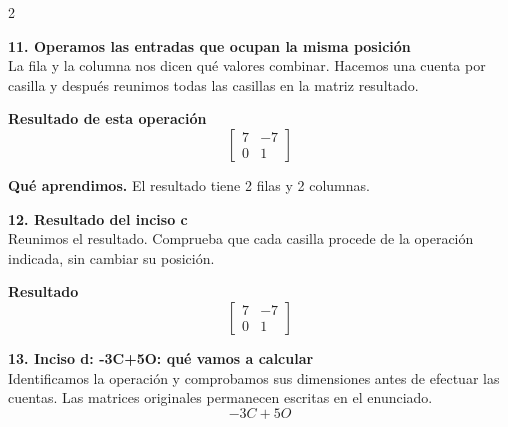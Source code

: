 \documentclass[11pt,a4paper,landscape]{article}
\begin{document}
\begin{multicols*}{2}
\noindent\begin{minipage}{\linewidth}\textbf{11. Operamos las entradas que ocupan la misma posición}\\[2pt]La fila y la columna nos dicen qué valores combinar. Hacemos una cuenta por casilla y después reunimos todas las casillas en la matriz resultado.
\par{}\par\smallskip
\par\smallskip \textbf{Resultado de esta operación}\[\begin{bmatrix}7 & -7\\0 & 1\end{bmatrix}\]
\par\smallskip\textbf{Qué aprendimos.} El resultado tiene 2 filas y 2 columnas.
\end{minipage}\par\medskip
\noindent\begin{minipage}{\linewidth}\textbf{12. Resultado del inciso c}\\[2pt]Reunimos el resultado. Comprueba que cada casilla procede de la operación indicada, sin cambiar su posición.
\par\smallskip \textbf{Resultado}\[\begin{bmatrix}7 & -7\\0 & 1\end{bmatrix}\]
\end{minipage}\par\medskip
\noindent\begin{minipage}{\linewidth}\textbf{13. Inciso d: -3C+5O: qué vamos a calcular}\\[2pt]Identificamos la operación y comprobamos sus dimensiones antes de efectuar las cuentas. Las matrices originales permanecen escritas en el enunciado.
\[-3C+5O\]
\end{minipage}\par\medskip

\end{multicols*}
\end{document}
